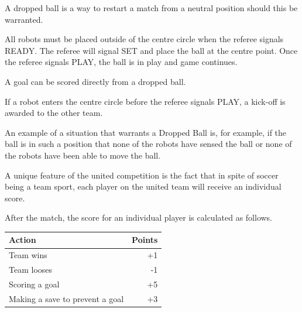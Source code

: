 \documentclass[12pt]{hurocup}
\begin{document}

\begin{lawlist}[US]
  \item A dropped ball is a way to restart a match from a neutral
    position should this be warranted.

  \item All robots must be placed outside of the centre circle when
    the referee signals READY. The referee will signal SET and place
    the ball at the centre point. Once the referee signals PLAY, the
    ball is in play and game continues.

  \item A goal can be scored directly from a dropped ball.

  \item If a robot enters the centre circle before the referee signals
    PLAY, a kick-off is awarded to the other team.
\end{lawlist}

\begin{decisions}
\item An example of a situation that warrants a Dropped Ball is, for
  example, if the ball is in such a position that none of the robots
  have sensed the ball or none of the robots have been able to move
  the ball.
\end{decisions}


\begin{lawlist}[US]

\item A unique feature of the united competition is the fact that in
  spite of soccer being a team sport, each player on the united team
  will receive an individual score.

\item After the match, the score for an individual player is
  calculated as follows. 

  \begin{center}
    \begin{tabular}{|l|r|}
      \hline
      Action & Points \\
      \hline
      Team wins                       & +1\\
      Team looses                     & -1\\
      Scoring a goal                  & +5\\
      Making a save to prevent a goal & +3\\
      \hline
    \end{tabular}
  \end{center}

\end{lawlist}
\end{document}
